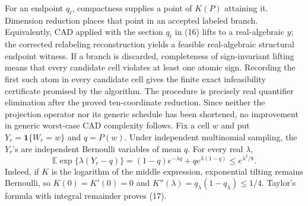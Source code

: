 For an endpoint \(q_t\), compactness supplies a point of \(K(P)\) attaining it.  Dimension reduction places that point in an accepted labeled branch.  Equivalently, CAD applied with the section \(q_t\) in (16) lifts to a real-algebraic \(y\); the corrected relabeling reconstruction yields a feasible real-algebraic structural endpoint witness.  If a branch is discarded, completeness of sign-invariant lifting means that every candidate cell violates at least one atomic sign.  Recording the first such atom in every candidate cell gives the finite exact infeasibility certificate promised by the algorithm.  The procedure is precisely real quantifier elimination after the proved ten-coordinate reduction.  Since neither the projection operator nor its generic schedule has been shortened, no improvement in generic worst-case CAD complexity follows.
Fix a cell \(w\) and put \(Y_r=\mathbf 1\{W_r=w\}\) and \(q=P(w)\).  Under independent multinomial sampling, the \(Y_r\)'s are independent Bernoulli variables of mean \(q\).  For every real \(\lambda\),
\[
 \mathbb E\exp\{\lambda(Y_r-q)\}
 =(1-q)e^{-\lambda q}+qe^{\lambda(1-q)}
 \leq e^{\lambda^2/8}.
 \tag{17}
\]
Indeed, if \(K\) is the logarithm of the middle expression, exponential tilting remains Bernoulli, so \(K(0)=K'(0)=0\) and \(K''(\lambda)=q_\lambda(1-q_\lambda)\leq1/4\).  Taylor's formula with integral remainder proves (17).

